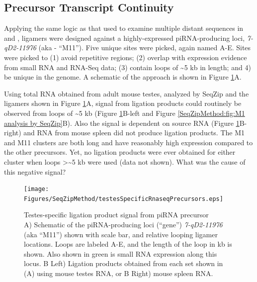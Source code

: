   \subsection{Precursor Transcript Continuity}
    \label{SeqZipMethod:sec:piRNA precursor by SeqZip}

    Applying the same logic as that used to examine multiple distant sequences in \dst{} and \fn{}, ligamers were designed against a highly-expressed piRNA-producing loci, \textit{7-qD2-11976} (aka - ``M11''). Five unique sites were picked, again named A-E. Sites were picked to (1) avoid repetitive regions; (2) overlap with expression evidence from small RNA and RNA-Seq data; (3) contain loops of \textasciitilde5 kb in length; and 4) be unique in the genome. A schematic of the approach is shown in Figure \ref{SeqZipMethod:fig:Precursors are testes-specific}A.

    Using total RNA obtained from adult mouse testes, analyzed by SeqZip and the ligamers shown in Figure \ref{SeqZipMethod:fig:Precursors are testes-specific}A, signal from ligation products could routinely be observed from loops of \textasciitilde5 kb (Figure \ref{SeqZipMethod:fig:Precursors are testes-specific}B-left and Figure \ref{SeqZipMethod:fig:M1 analysis by SeqZip}B). Also the signal is dependent on source RNA (Figure \ref{SeqZipMethod:fig:Precursors are testes-specific}B-right) and RNA from mouse spleen did not produce ligation products. The M1 and M11 clusters are both long and have reasonably high expression compared to the other precursors. Yet, no ligation products were ever obtained for either cluster when loops >\textasciitilde5 kb were used (data not shown). What was the cause of this negative signal?

    \begin{figure} %
        \centering 
        \texttt{[image: Figures/SeqZipMethod/testesSpecificRnaseqPrecursors.eps]}
        \caption[Testes-specific ligation product signal from piRNA precursor]
        {
          Testes-specific ligation product signal from piRNA precursor\\[0.25cm]
          A) Schematic of the piRNA-producing loci (``gene'') \textit{7-qD2-11976} (aka ``M11'') shown with scale bar, and relative looping ligamer locations.  Loops are labeled A-E, and the length of the loop in kb is shown.  Also shown in green is small RNA expression along this locus. B Left) Ligation products obtained from each set shown in (A) using mouse testes RNA, or B Right) mouse spleen RNA.
        	}
        \label{SeqZipMethod:fig:Precursors are testes-specific}
      	\end{figure}

